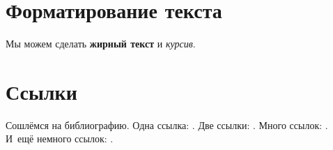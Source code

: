 \section{Форматирование текста} \label{sec:ch1/sec1_}

Мы можем сделать \textbf{жирный текст} и \textit{курсив}.

\section{Ссылки} \label{sec:ch1/sec2}
Сошлёмся на библиографию.
Одна ссылка: \cite[с.~54]{Sokolov}\cite[с.~36]{Gaidaenko}.
Две ссылки: \cite{Sokolov,Gaidaenko}.
Много ссылок: %
\cite{Lermontov, Management, Borozda, Marketing, Constitution, FamilyCode,
Gost.7.0.53, Razumovski, Lagkueva, Pokrovski, Methodology, Nasirova, Berestova,
Kriger}%
%
.
И~ещё немного ссылок:
\cite{Article,Book,Booklet,Conference,Inbook,Incollection,Manual,Mastersthesis,
Misc,Phdthesis,Proceedings,Techreport,Unpublished}
\cite{medvedev2006jelektronnye, CEAT:CEAT581, doi:10.1080/01932691.2010.513279,
Gosele1999161,Li2007StressAnalysis, Shoji199895, test:eisner-sample,
test:eisner-sample-shorted, AB_patent_Pomerantz_1968, iofis_patent1960}
%
.

%

